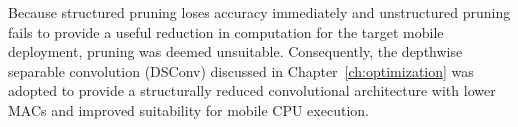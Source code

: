 \begin{appendices}
Because structured pruning loses accuracy immediately and unstructured
pruning fails to provide a useful reduction in computation for the
target mobile deployment, pruning was deemed unsuitable. Consequently,
the depthwise separable convolution (DSConv) discussed in
Chapter~\ref{ch:optimization} was adopted to provide a structurally
reduced convolutional architecture with lower MACs and improved
suitability for mobile CPU execution.

\end{appendices}
